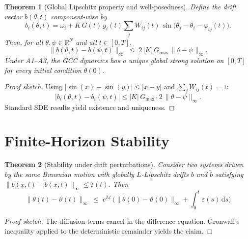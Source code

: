 \documentclass[11pt,a4paper]{article}
\theoremstyle{plain}
\newtheorem{theorem}{Theorem}[section]
\theoremstyle{definition}
\theoremstyle{remark}
\newcommand{\Gmax}{G_{\max}}
\begin{document}
\begin{theorem}[Global Lipschitz property and well-posedness]
\label{satz:lipschitz}
Define the drift vector $b(\theta,t)$ component-wise by
\begin{equation}
b_i(\theta,t) = \omega_i + K\,G(t)\,g_i(t)\sum_j W_{ij}(t)\,\sin\!\bigl(\theta_j - \theta_i - \varphi_{ij}(t)\bigr).
\end{equation}
Then, for all $\theta,\psi \in \mathbb{R}^N$ and all $t \in [0,T]$,
\begin{equation}
\label{eq:lipschitz}
\|b(\theta,t) - b(\psi,t)\|_{\infty} \;\leq\; 2\,|K|\,\Gmax\,\|\theta - \psi\|_{\infty}.
\end{equation}
Under \textup{A1--A3}, the GCC dynamics has a unique global strong solution on $[0,T]$ for every initial condition $\theta(0)$.
\end{theorem}

\begin{proof}[Proof sketch]
Using $|\sin(x) - \sin(y)| \leq |x - y|$ and $\sum_j W_{ij}(t) = 1$:
\begin{equation}
|b_i(\theta,t) - b_i(\psi,t)| \leq |K|\,\Gmax \cdot 2\,\|\theta - \psi\|_{\infty}.
\end{equation}
Standard SDE results yield existence and uniqueness.
\end{proof}

\section{Finite-Horizon Stability}

\begin{theorem}[Stability under drift perturbations]
\label{satz:stabilitaet}
Consider two systems driven by the same Brownian motion with globally $L$-Lipschitz drifts $b$ and $\tilde{b}$ satisfying $\|b(x,t) - \tilde{b}(x,t)\|_{\infty} \leq \varepsilon(t)$. Then
\begin{equation}
\label{eq:gronwall}
\|\theta(t) - \vartheta(t)\|_{\infty}
\;\leq\; e^{Lt}\,\biggl(\|\theta(0) - \vartheta(0)\|_{\infty} + \int_0^t \varepsilon(s)\,\mathrm{d}s\biggr)
\end{equation}
\end{theorem}

\begin{proof}[Proof sketch]
The diffusion terms cancel in the difference equation. Gronwall's inequality applied to the deterministic remainder yields the claim.
\end{proof}
\end{document}
